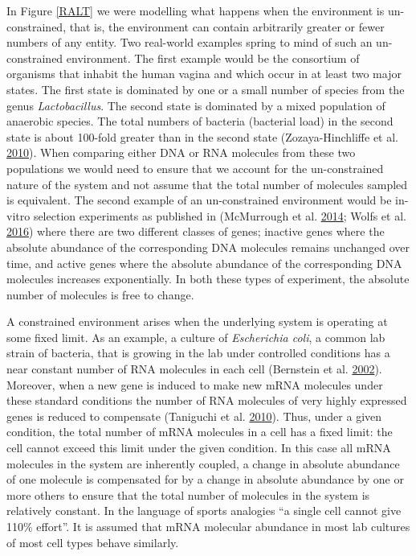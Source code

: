 \documentclass[onecolumn]{book}
\theoremstyle{definition}
\theoremstyle{definition}
\theoremstyle{definition}
\theoremstyle{remark}
\begin{document}
In Figure \ref{RALT} we were modelling what happens when the environment
is un-constrained, that is, the environment can contain arbitrarily
greater or fewer numbers of any entity. Two real-world examples spring
to mind of such an un-constrained environment. The first example would
be the consortium of organisms that inhabit the human vagina and which
occur in at least two major states. The first state is dominated by one
or a small number of species from the genus \emph{Lactobacillus}. The
second state is dominated by a mixed population of anaerobic species.
The total numbers of bacteria (bacterial load) in the second state is
about 100-fold greater than in the second state (Zozaya-Hinchliffe et
al. \protect\hyperlink{ref-Zozaya:2010}{2010}). When comparing either
DNA or RNA molecules from these two populations we would need to ensure
that we account for the un-constrained nature of the system and not
assume that the total number of molecules sampled is equivalent. The
second example of an un-constrained environment would be in-vitro
selection experiments as published in (McMurrough et al.
\protect\hyperlink{ref-mcmurrough:2014}{2014}; Wolfs et al.
\protect\hyperlink{ref-Wolfs:2016aa}{2016}) where there are two
different classes of genes; inactive genes where the absolute abundance
of the corresponding DNA molecules remains unchanged over time, and
active genes where the absolute abundance of the corresponding DNA
molecules increases exponentially. In both these types of experiment,
the absolute number of molecules is free to change.

A constrained environment arises when the underlying system is operating
at some fixed limit. As an example, a culture of
\emph{Escherichia coli}, a common lab strain of bacteria, that is
growing in the lab under controlled conditions has a near constant
number of RNA molecules in each cell (Bernstein et al.
\protect\hyperlink{ref-mRNA:2002}{2002}). Moreover, when a new gene is
induced to make new mRNA molecules under these standard conditions the
number of RNA molecules of very highly expressed genes is reduced to
compensate (Taniguchi et al.
\protect\hyperlink{ref-Taniguchi:2010aa}{2010}). Thus, under a given
condition, the total number of mRNA molecules in a cell has a fixed
limit: the cell cannot exceed this limit under the given condition. In
this case all mRNA molecules in the system are inherently coupled, a
change in absolute abundance of one molecule is compensated for by a
change in absolute abundance by one or more others to ensure that the
total number of molecules in the system is relatively constant. In the
language of sports analogies ``a single cell cannot give 110\% effort''.
It is assumed that mRNA molecular abundance in most lab cultures of most
cell types behave similarly.
\end{document}

